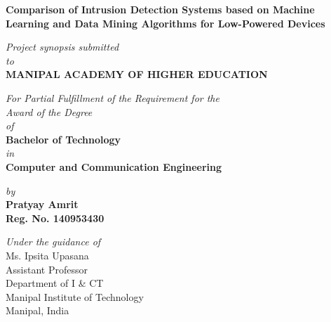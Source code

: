 \documentclass[a4paper,12pt]{article}
\begin{document}
	\begin{titlepage}
		
		\vspace*{2cm}
		\begin{center}
		\large{\textbf{Comparison of Intrusion Detection Systems based on Machine Learning and Data Mining Algorithms for Low-Powered Devices}}
		\end{center}
		\vspace{0.5cm}
		\begin{center}
		\small{\textit{Project synopsis submitted} \\ \vspace{0.25cm} \textit{to} \\ \vspace{0.25cm}\textbf{MANIPAL ACADEMY OF HIGHER EDUCATION} \\}
		\end{center}
		\vspace{0.25cm}
		\begin{center}
		\small{\textit{For Partial Fulfillment of the Requirement for the\\ \vspace{0.25cm}Award of the Degree\\ \vspace{0.25cm}of}} \\ \vspace{0.25cm}
		\textbf{Bachelor of Technology} \\  \vspace{0.25cm} \textit{in} \\ \textbf{Computer and Communication Engineering}
		\end{center}
		\begin{center}
		\small{\textit{by}} \\
		\textbf{Pratyay Amrit} \\ \textbf{Reg. No. 140953430} \\
		\end{center}

		\begin{center}
		\small{\textit{Under the guidance of}} \\
		\renewcommand{\baselinestretch}{1}
		\vspace{0.5cm}
		Ms. Ipsita Upasana \\
		Assistant Professor \\
		Department of I \& CT \\
		 Manipal Institute of Technology \\
		Manipal, India 
		\end{center}


\end{titlepage}
\end{document}
